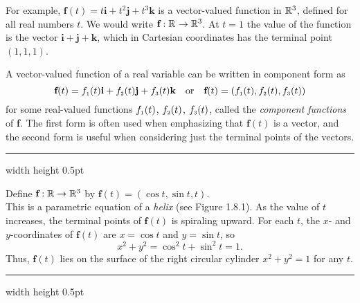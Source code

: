 For example, $\textbf{f}(t) = t \textbf{i} + t^2 \textbf{j} + t^3 \textbf{k}$ is a vector-valued function in $\mathbb{R}^{3}$,
defined for all real numbers $t$. 
We would write $\textbf{f}: \mathbb{R}^{} \rightarrow \mathbb{R}^{3}$. 
At $t = 1$
the value of the function is the vector $\textbf{i} + \textbf{j} + \textbf{k}$, which in Cartesian coordinates has the
terminal point $(1,1,1)$.

A vector-valued function of a real variable can be written in component form as
\begin{displaymath}
 \textbf{f}(t) = f_{\scriptscriptstyle 1}(t) \textbf{i} + f_{\scriptscriptstyle 2}(t) \textbf{j} + f_{\scriptscriptstyle 3}(t) \textbf{k}\quad\text{or}\quad\textbf{f}(t) = ( f_{\scriptscriptstyle 1}(t),f_{\scriptscriptstyle 2}(t),f_{\scriptscriptstyle 3}(t) )
\end{displaymath}
for some real-valued functions $f_{\scriptscriptstyle 1}(t)$, $f_{\scriptscriptstyle 2}(t)$, $f_{\scriptscriptstyle 3}(t)$, called the \emph{component 
functions} of \textbf{f}. 
The first form is often used when emphasizing that $\textbf{f}(t)$ is a vector, and the second form is useful when considering just the terminal points of the vectors.

\vspace{2mm}
\hrule width \textwidth height 0.5pt
\piccaption[]{}
\begin{exmp}
 Define $\textbf{f}: \mathbb{R} \rightarrow \mathbb{R}^{3}$ by $\textbf{f}(t) = ( \cos t , \sin t , t )$.\\ 
 This is a parametric equation of a \emph{helix} (see Figure 1.8.1). 
 As the value of $t$ increases, the terminal points of
 $\textbf{f}(t)$ is spiraling upward. 
 For each $t$, the $x$- and $y$-coordinates of $\textbf{f}(t)$
 are $x = \cos t$ and $y = \sin t$, so
 \begin{displaymath}
 x^2 + y^2 = \cos^2 t + \sin^2 t = 1.
 \end{displaymath}
 Thus, $\textbf{f}(t)$ lies on the surface of the right circular cylinder $x^2 + y^2 = 1$ for any $t$.
\end{exmp}
\hrule width \textwidth height 0.5pt
\vspace{2mm}

